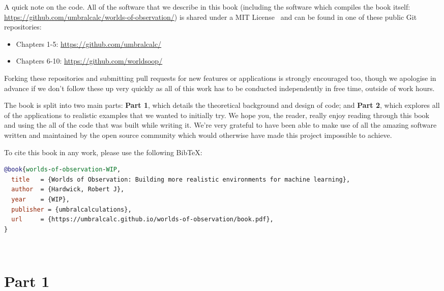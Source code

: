 \documentclass{book}
\begin{document}
A quick note on the code. All of the software that we describe in this book (including the software which compiles the book itself: \href{https://github.com/umbralcalc/worlds-of-observation/}{https://github.com/umbralcalc/worlds-of-observation/}) is shared under a MIT License~\cite{mitlicense} and can be found in one of these public Git repositories:
\begin{itemize}
\item{Chapters 1-5: \href{https://github.com/umbralcalc/}{https://github.com/umbralcalc/}}
\item{Chapters 6-10: \href{https://github.com/worldsoop/}{https://github.com/worldsoop/}} 
\end{itemize}
Forking these repositories and submitting pull requests for new features or applications is strongly encouraged too, though we apologise in advance if we don't follow these up very quickly as all of this work has to be conducted independently in free time, outside of work hours.

The book is split into two main parts: {\bfseries\sffamily Part 1}, which details the theoretical background and design of code; and {\bfseries\sffamily Part 2}, which explores all of the applications to realistic examples that we wanted to initially try. We hope you, the reader, really enjoy reading through this book and using the all of the code that was built while writing it. We're very grateful to have been able to make use of all the amazing software written and maintained by the open source community which would otherwise have made this project impossible to achieve.

To cite this book in any work, please use the following BibTeX:
\begin{adjustwidth}{2em}{2em}
\begin{lstlisting}[language=BibTeX,numbers=none]
@book{worlds-of-observation-WIP,
  title   = {Worlds of Observation: Building more realistic environments for machine learning},
  author  = {Hardwick, Robert J},
  year    = {WIP},
  publisher = {umbralcalculations},
  url     = {https://umbralcalc.github.io/worlds-of-observation/book.pdf},
}
\end{lstlisting}
\end{adjustwidth}

\newpage \ \newpage
{\sffamily \tableofcontents}
\mainmatter

\part*{{\sffamily Part 1}}
\end{document}
